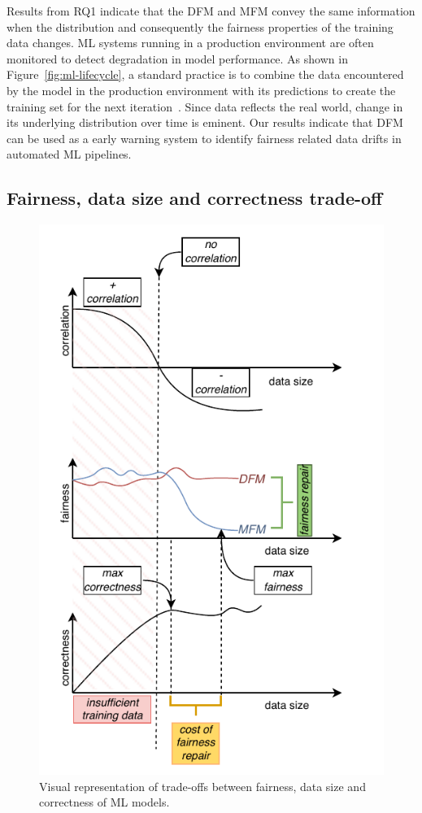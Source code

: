 \documentclass[conference,review,anonymous]{IEEEtran}
\begin{document}
Results from RQ1 indicate that the DFM and MFM convey the same
information when the distribution and consequently the fairness
properties of the training data changes. ML systems running in a
production environment are often monitored to detect degradation in
model performance. As shown in Figure \ref{fig:ml-lifecycle}, a
standard practice is to combine the data encountered by the model in
the production environment with its predictions to create the training
set for the next iteration \cite{biessmann2021automated}. Since data
reflects the real world, change in its underlying distribution over
time is eminent. Our results indicate that DFM can be used as a early
warning system to identify fairness related data drifts in automated
ML pipelines.

\subsection{Fairness, data size and correctness trade-off}\label{sec:discuss-fair-eff-perf-trade}

\begin{figure}
  \centering
  \includegraphics[width=\linewidth]{tradeoff.pdf}
  \caption{Visual representation of trade-offs between fairness, data
    size and correctness of ML models.}
  \label{fig:tradeoff}
\end{figure}
\end{document}
